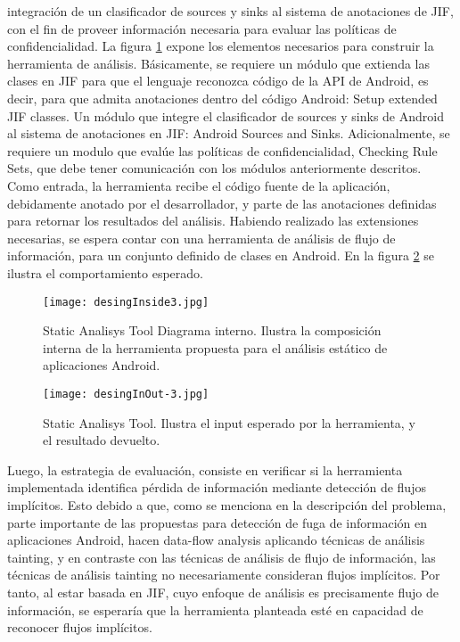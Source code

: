 integración de un clasificador de sources y sinks al sistema de anotaciones de
JIF, con el fin de proveer información necesaria para evaluar las políticas de
confidencialidad.\newline 
La figura \ref{fig:desing1-in} expone los elementos necesarios para construir la
herramienta de análisis. Básicamente, se requiere un módulo que extienda las
clases en JIF para que el lenguaje reconozca código de la API de Android, es
decir, para que admita anotaciones dentro del código Android: Setup extended JIF
classes. Un módulo que integre el clasificador de sources y sinks de Android al
sistema de anotaciones en JIF:  Android Sources and Sinks. Adicionalmente, se
requiere un modulo que evalúe las políticas de confidencialidad, Checking
Rule Sets, que debe tener comunicación con los módulos anteriormente descritos.
Como entrada, la herramienta recibe el código fuente de la aplicación,
debidamente anotado por el desarrollador, y parte de las anotaciones definidas
para retornar los resultados del análisis.\newline
Habiendo realizado las extensiones necesarias, se espera contar con una
herramienta de análisis de flujo de información, para un conjunto definido de
clases en Android. En la figura \ref{fig:desing1} se ilustra el comportamiento
esperado.\newline

\begin{figure}[t!]
	\begin{center}
	\texttt{[image: desingInside3.jpg]}
	\end{center}
	\caption{Static Analisys Tool Diagrama interno. Ilustra la composición interna
	de la herramienta propuesta para el análisis estático de aplicaciones Android.}
	\label{fig:desing1-in}
\end{figure}

\begin{figure}[t!]
	\begin{center}
	\texttt{[image: desingInOut-3.jpg]}
	\end{center}
	\caption{Static Analisys Tool. Ilustra el input esperado por la herramienta, y
	el resultado devuelto.}
	\label{fig:desing1}
\end{figure} 

Luego, la estrategia de evaluación, consiste en verificar si la herramienta
implementada identifica pérdida de información mediante detección de flujos
implícitos. Esto debido a que, como se menciona en la descripción del problema,
parte importante de las propuestas para detección de fuga de información en
aplicaciones Android, hacen data-flow analysis aplicando técnicas de análisis
tainting, y en contraste con las técnicas de análisis de flujo de información,
las técnicas de análisis tainting no necesariamente consideran flujos
implícitos. Por tanto, al estar basada en JIF, cuyo enfoque de análisis es
precisamente flujo de información, se esperaría que la herramienta planteada
esté en capacidad de reconocer flujos implícitos.

